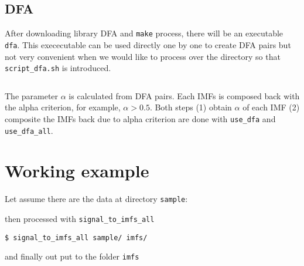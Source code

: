 \documentclass{article}
\begin{document}
\subsection*{DFA}
After downloading library DFA and \texttt{make} process, there will be an executable \texttt{dfa}. This exececutable can be used directly one by one to create DFA pairs but not very convenient when we would like to process over the directory so that \texttt{script\_dfa.sh} is introduced.\\
\begin{verbatim}
\end{verbatim}

The parameter $\alpha$ is calculated from DFA pairs. Each IMFs is composed back with the alpha criterion, for example, $\alpha > 0.5$. Both steps (1) obtain $\alpha$ of each IMF (2) composite the IMFs back due to alpha criterion are done with \texttt{use\_dfa} and \texttt{use\_dfa\_all}.

\section*{Working example}
Let assume there are the data at directory \texttt{sample}:

then processed with \texttt{signal\_to\_imfs\_all}
\begin{verbatim}
$ signal_to_imfs_all sample/ imfs/
\end{verbatim}
and finally out put to the folder \texttt{imfs}

\end{document}
